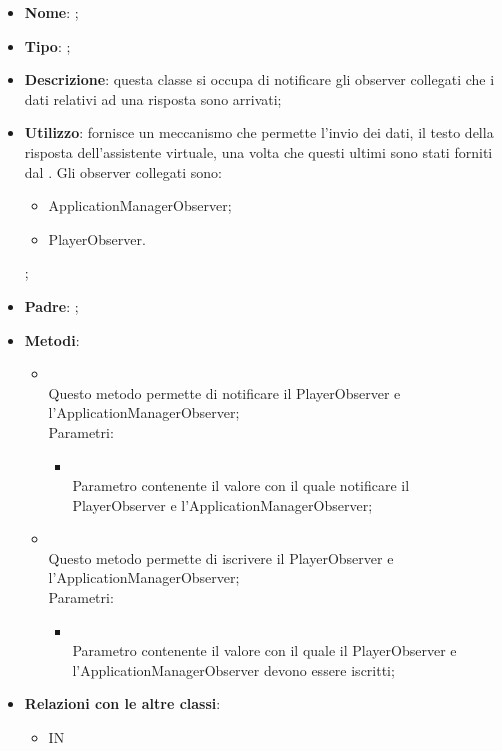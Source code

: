 \begin{itemize}
	\item \textbf{Nome}: ;
	\item \textbf{Tipo}: ;
	\item \textbf{Descrizione}: questa classe si occupa di notificare gli observer collegati che i dati relativi ad una risposta sono arrivati;
	\item \textbf{Utilizzo}: fornisce un meccanismo che permette l'invio dei dati, il testo della risposta dell'assistente virtuale, una volta che questi ultimi sono stati forniti dal .
Gli observer collegati sono:
\begin{itemize}
\item ApplicationManagerObserver;
\item PlayerObserver.
\end{itemize};
	\item \textbf{Padre}: ;
	\item \textbf{Metodi}:
	\begin{itemize}
		\item[]  \\
		Questo metodo permette di notificare il PlayerObserver e l'ApplicationManagerObserver;\\
		Parametri:
		\begin{itemize}
			\item {} \\
			Parametro contenente il valore con il quale notificare il PlayerObserver e l'ApplicationManagerObserver;
		\end{itemize}
		\item[]  \\
		Questo metodo permette di iscrivere il PlayerObserver e l'ApplicationManagerObserver;\\
		Parametri:
		\begin{itemize}
			\item {} \\
			Parametro contenente il valore con il quale il PlayerObserver e l'ApplicationManagerObserver devono essere iscritti;
		\end{itemize}
	\end{itemize}
	\item \textbf{Relazioni con le altre classi}:
	\begin{itemize}
		\item IN \hyperlink{Logic_label}{}
	\end{itemize}
\end{itemize}
\FloatBarrier

